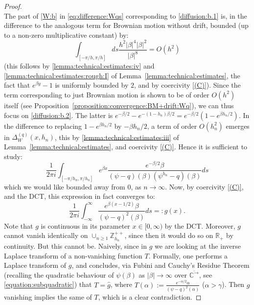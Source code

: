 \documentclass[pdftex,oneside,11pt,reqno]{amsart}
\theoremstyle{definition}
\theoremstyle{theorem}
\theoremstyle{remark}
\numberwithin{equation}{section}
\numberwithin{definition}{section}
\begin{document}
\begin{proof}
\begin{equation}
\end{equation} The part of \ref{W:b} in \eqref{eq:difference:Wqs} corresponding to \ref{diffusion:b.1} is, in the difference to the analogous term for Brownian motion without drift, bounded (up to a non-zero multiplicative constant) by: $$\int_{[-\pi/h,\pi/h]}ds \frac{h^2\vert \beta\vert^4 \vert \beta\vert^2}{\vert\beta\vert^8}=O(h^2)$$ (this follows by \ref{lemma:technical:estimates:iv} and \ref{lemma:technical:estimates:rough:I} of Lemma~\ref{lemma:technical:estimates}, the fact that $e^{\beta y}-1$ is uniformly bounded by $2$, and by coercivity \ref{(C)}). Since the term corresponding to just Brownian motion is shown to be of order $O(h^2)$ itself (see Proposition~\ref{proposition:convergence:BM+drift:Wq}), we can thus focus on \ref{diffusion:b.2}. The latter is $e^{-\beta/2}-e^{-(1-h_n)\beta/2}=e^{-\beta/2}(1-e^{\beta h_n/2})$. In the difference to replacing $1-e^{\beta h_n/2}$ by $-\beta h_n/2$, a term of order $O(h_n^2)$ emerges in ${\Delta_{W}^{(q)}(x,h_n)}$, this by \ref{lemma:technical:estimates:iii} of Lemma~\ref{lemma:technical:estimates}, and coercivity \ref{(C)}. Hence it is sufficient to study: $$\frac{1}{2\pi i}\int_{[-\pi/h_n,\pi/h_n]}e^{\beta x}\frac{e^{-\beta/2 }\beta}{(\psi-q)(\beta)(\psi^{h_n}-q)(\beta)}ds$$ which we would like bounded away from $0$, as $n\to\infty$. Now, by coercivity \ref{(C)}, and the DCT, this expression in fact converges to: $$\frac{1}{2\pi i}\int_{-\infty}^\infty \frac{e^{\beta (x-1/2)}\beta }{(\psi-q)^2(\beta)}ds=:g(x).$$ Note that $g$ is continuous in its parameter $x\in [0,\infty)$ by the DCT. Moreover, $g$ cannot vanish identically on $\cup_{n\geq 1}\mathbb{Z}_{h_n}^{++}$, since then it would do so on $\mathbb{R}_+$ by continuity. But this cannot be. Naively, since in $g$ we are looking at the inverse Laplace transform of a non-vanishing function $T$. Formally, one performs a Laplace transform of $g$, and concludes, via Fubini and Cauchy's Residue Theorem (recalling the quadratic behaviour of $\psi(\beta)$ as $\vert \beta\vert\to\infty$ over ${\overline{\mathbb{C}^{\rightarrow}}}$, see \eqref{equation:subquadratic}) that $T=\hat{g}$, where $T(\alpha):=\frac{e^{-\alpha /2}\alpha}{(\psi-q)^2(\alpha)}$ ($\alpha>\gamma$). Then $g$ vanishing implies the same of $T$, which is a clear contradiction.


\end{proof}
\end{document}
